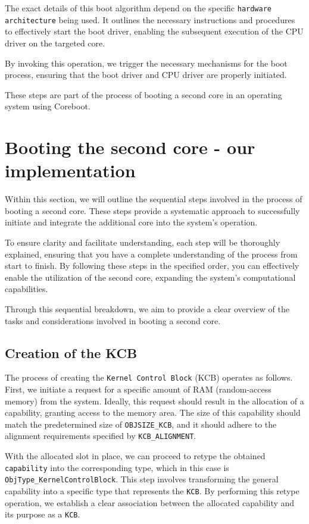 The exact details of this boot algorithm depend on the specific \texttt{hardware architecture} being used. It outlines the necessary instructions and procedures to effectively start the boot driver, enabling the subsequent execution of the CPU driver on the targeted core.

By invoking this operation, we trigger the necessary mechanisms for the boot process, ensuring that the boot driver and CPU driver are properly initiated.

These steps are part of the process of booting a second core in an operating system using Coreboot.

\section{Booting the second core - our implementation}

Within this section, we will outline the sequential steps involved in the process of booting a second core. These steps provide a systematic approach to successfully initiate and integrate the additional core into the system's operation.

To ensure clarity and facilitate understanding, each step will be thoroughly explained, ensuring that you have a complete understanding of the process from start to finish. By following these steps in the specified order, you can effectively enable the utilization of the second core, expanding the system's computational capabilities.

Through this sequential breakdown, we aim to provide a clear overview of the tasks and considerations involved in booting a second core. 

\subsection{Creation of the KCB}

The process of creating the \texttt{Kernel Control Block} (KCB) operates as follows. First, we initiate a request for a specific amount of RAM (random-access memory) from the system. Ideally, this request should result in the allocation of a capability, granting access to the memory area. The size of this capability should match the predetermined size of \texttt{OBJSIZE\_KCB}, and it should adhere to the alignment requirements specified by \texttt{KCB\_ALIGNMENT}.

With the allocated slot in place, we can proceed to retype the obtained \texttt{capability} into the corresponding type, which in this case is \texttt{ObjType\_KernelControlBlock}. This step involves transforming the general capability into a specific type that represents the \texttt{KCB}. By performing this retype operation, we establish a clear association between the allocated capability and its purpose as a \texttt{KCB}.


